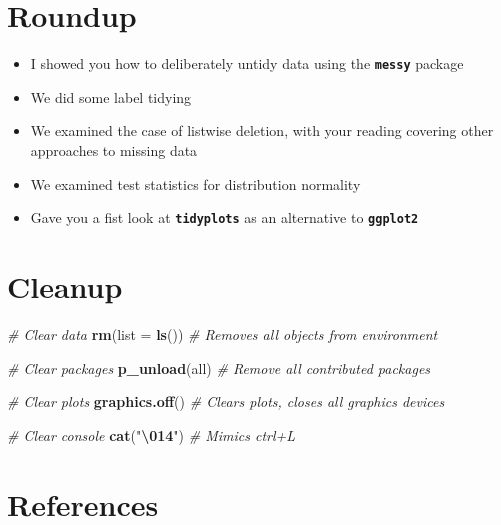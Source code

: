 \documentclass[
]{article}
\newenvironment{Shaded}{\begin{snugshade}}{\end{snugshade}}
\newcommand{\AttributeTok}[1]{\textcolor[rgb]{0.13,0.29,0.53}{#1}}
\newcommand{\CommentTok}[1]{\textcolor[rgb]{0.56,0.35,0.01}{\textit{#1}}}
\newcommand{\FunctionTok}[1]{\textcolor[rgb]{0.13,0.29,0.53}{\textbf{#1}}}
\newcommand{\NormalTok}[1]{#1}
\newcommand{\SpecialCharTok}[1]{\textcolor[rgb]{0.81,0.36,0.00}{\textbf{#1}}}
\newcommand{\StringTok}[1]{\textcolor[rgb]{0.31,0.60,0.02}{#1}}
\providecommand{\tightlist}{%
  \setlength{\itemsep}{0pt}\setlength{\parskip}{0pt}}
\begin{document}
\hypertarget{roundup}{%
\section{Roundup}\label{roundup}}

\begin{itemize}
\tightlist
\item
  I showed you how to deliberately untidy data using the
  \textbf{\texttt{messy}} package
\item
  We did some label tidying
\item
  We examined the case of listwise deletion, with your reading covering
  other approaches to missing data
\item
  We examined test statistics for distribution normality
\item
  Gave you a fist look at \textbf{\texttt{tidyplots}} as an alternative
  to \textbf{\texttt{ggplot2}}
\end{itemize}

\hypertarget{cleanup}{%
\section{Cleanup}\label{cleanup}}

\begin{Shaded}
\begin{Highlighting}[]
\CommentTok{\# Clear data}
\FunctionTok{rm}\NormalTok{(}\AttributeTok{list =} \FunctionTok{ls}\NormalTok{())  }\CommentTok{\# Removes all objects from environment}

\CommentTok{\# Clear packages}
\FunctionTok{p\_unload}\NormalTok{(all)  }\CommentTok{\# Remove all contributed packages}

\CommentTok{\# Clear plots}
\FunctionTok{graphics.off}\NormalTok{()  }\CommentTok{\# Clears plots, closes all graphics devices}

\CommentTok{\# Clear console}
\FunctionTok{cat}\NormalTok{(}\StringTok{"}\SpecialCharTok{\textbackslash{}014}\StringTok{"}\NormalTok{)  }\CommentTok{\# Mimics ctrl+L}
\end{Highlighting}
\end{Shaded}

\hypertarget{references}{%
\section{References}\label{references}}
\end{document}
